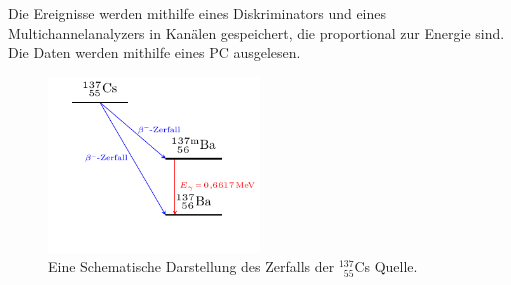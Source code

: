 Die Ereignisse werden mithilfe eines Diskriminators und eines Multichannelanalyzers in Kanälen gespeichert, die proportional zur Energie sind.
Die Daten werden mithilfe eines PC ausgelesen.
\begin{figure}[h!]
	\centering
	\includegraphics[width = 0.5\textwidth]{../Grafiken/Tikz/tikz-Energieschema.pdf}
	\caption{Eine Schematische Darstellung des Zerfalls der ${}^{137}_{\,\,\, 55}$Cs Quelle.}\label{fig:Energieschema}
\end{figure}